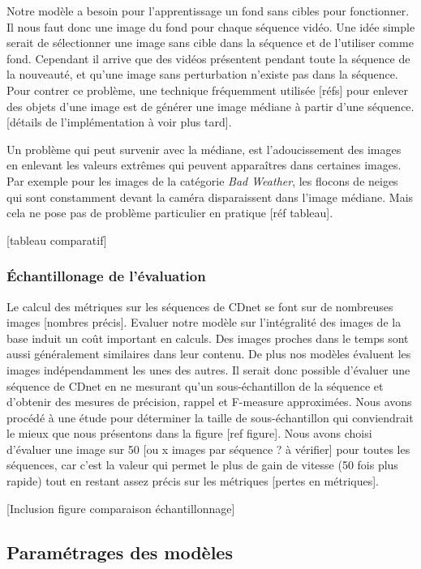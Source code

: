 	Notre modèle a besoin pour l'apprentissage un fond sans cibles pour fonctionner. Il nous faut donc une image du fond pour chaque séquence vidéo. Une idée simple serait de sélectionner une image sans cible dans la séquence et de l'utiliser comme fond. Cependant il arrive que des vidéos présentent pendant toute la séquence de la nouveauté, et qu'une image sans perturbation n'existe pas dans la séquence. Pour contrer ce problème, une technique fréquemment utilisée [réfs] pour enlever des objets d'une image est de générer une image médiane à partir d'une séquence. [détails de l'implémentation à voir plus tard].

	Un problème qui peut survenir avec la médiane, est l'adoucissement des images en enlevant les valeurs extrêmes qui peuvent apparaîtres dans certaines images. Par exemple pour les images de la catégorie \textit{Bad Weather}, les flocons de neiges qui sont constamment devant la caméra disparaissent dans l'image médiane. Mais cela ne pose pas de problème particulier en pratique [réf tableau].

	[tableau comparatif]
	
	\subsubsection{Échantillonage de l'évaluation}

	Le calcul des métriques sur les séquences de CDnet se font sur de nombreuses images [nombres précis]. Evaluer notre modèle sur l'intégralité des images de la base induit un coût important en calculs. Des images proches dans le temps sont aussi généralement similaires dans leur contenu. De plus nos modèles évaluent les images indépendamment les unes des autres. Il serait donc possible d'évaluer une séquence de CDnet en ne mesurant qu'un sous-échantillon de la séquence et d'obtenir des mesures de précision, rappel et F-measure approximées. Nous avons procédé à une étude pour déterminer la taille de sous-échantillon qui conviendrait le mieux que nous présentons dans la figure [ref figure]. Nous avons choisi d'évaluer une image sur 50 [ou x images par séquence ? à vérifier] pour toutes les séquences, car c'est la valeur qui permet le plus de gain de vitesse (50 fois plus rapide) tout en restant assez précis sur les métriques [pertes en métriques].   

	[Inclusion figure comparaison échantillonnage]

	\subsection{Paramétrages des modèles}


